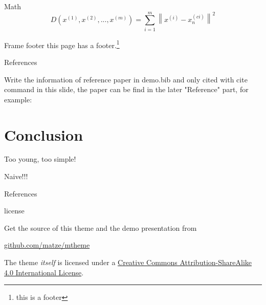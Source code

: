 \documentclass[10pt]{beamer}
\begin{document}
\begin{frame}{Math}
	\[
			D({x^{(1)}},{x^{(2)}},...,{x^{(m)}}) = \sum\limits_{i = 1}^m {{{\left\| {{x^{(i)}} - x_n^{(ci)}} \right\|}^2}} 
	\]
\end{frame}



\begin{frame}[fragile]{Frame footer}
    this page has a footer.\footnote{this is a footer}
\end{frame}


\begin{frame}{References}

	Write the information of reference paper in demo.bib 
	and only cited with cite command in this slide, the paper 
	can be find in the later "Reference" part, for example:

	\cite{knuth92,ConcreteMath,Simpson,Er01,greenwade93}
	
\end{frame}



\section{Conclusion}


\begin{frame}[standout]
  Too young, too simple! 
\end{frame}


\begin{frame}[standout]
  Naive!!! 
\end{frame}



\appendix



\begin{frame}[allowframebreaks]{References}

  
  

\end{frame}


\begin{frame}{license}

	Get the source of this theme and the demo presentation from

	\begin{center}
  		\url{github.com/matze/mtheme}
	\end{center}

  	The theme \emph{itself} is licensed under a
  	\href{http://creativecommons.org/licenses/by-sa/4.0/}{Creative Commons
  	Attribution-ShareAlike 4.0 International License}.

  	\begin{center}
  		\ccbysa
  	\end{center}
\end{frame}
\end{document}
